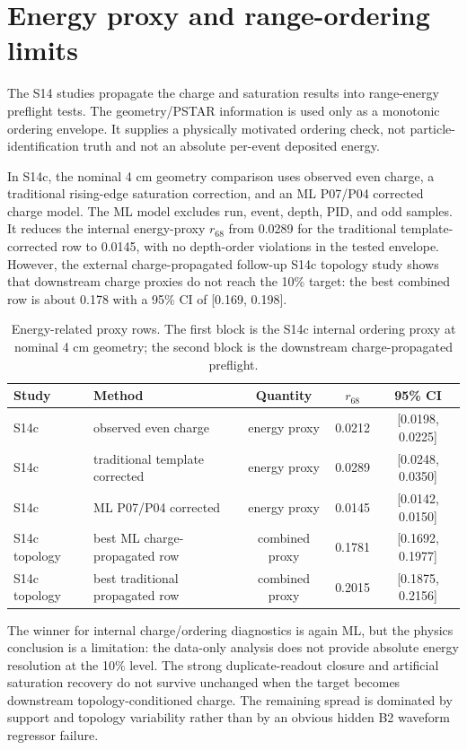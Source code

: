\section{Energy proxy and range-ordering limits}

The S14 studies propagate the charge and saturation results into range-energy
preflight tests.  The geometry/PSTAR information is used only as a monotonic
ordering envelope.  It supplies a physically motivated ordering check, not
particle-identification truth and not an absolute per-event deposited energy.

In S14c, the nominal 4 cm geometry comparison uses observed even charge,
a traditional rising-edge saturation correction, and an ML P07/P04 corrected
charge model.  The ML model excludes run, event, depth, PID, and odd samples.
It reduces the internal energy-proxy \(r_{68}\) from 0.0289 for the traditional
template-corrected row to 0.0145, with no depth-order violations in the tested
envelope.  However, the external charge-propagated follow-up S14c topology
study shows that downstream charge proxies do not reach the 10\% target:
the best combined row is about 0.178 with a 95\% CI of [0.169, 0.198].

\begin{table}[H]
\centering
\caption{Energy-related proxy rows.  The first block is the S14c internal
ordering proxy at nominal 4 cm geometry; the second block is the downstream
charge-propagated preflight.}
\begin{tabular}{llccc}
\toprule
Study & Method & Quantity & \(r_{68}\) & 95\% CI \\
\midrule
S14c & observed even charge & energy proxy & 0.0212 & [0.0198, 0.0225] \\
S14c & traditional template corrected & energy proxy & 0.0289 & [0.0248, 0.0350] \\
S14c & ML P07/P04 corrected & energy proxy & 0.0145 & [0.0142, 0.0150] \\
S14c topology & best ML charge-propagated row & combined proxy & 0.1781 & [0.1692, 0.1977] \\
S14c topology & best traditional propagated row & combined proxy & 0.2015 & [0.1875, 0.2156] \\
\bottomrule
\end{tabular}
\label{tab:energy-proxy}
\end{table}

The winner for internal charge/ordering diagnostics is again ML, but the
physics conclusion is a limitation: the data-only analysis does not provide
absolute energy resolution at the 10\% level.  The strong duplicate-readout
closure and artificial saturation recovery do not survive unchanged when the
target becomes downstream topology-conditioned charge.  The remaining spread
is dominated by support and topology variability rather than by an obvious
hidden B2 waveform regressor failure.

